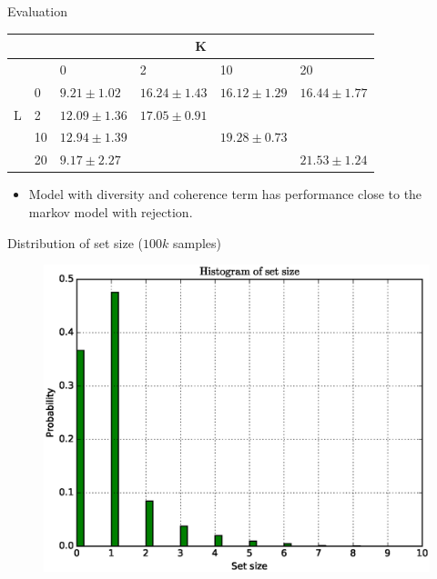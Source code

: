 \documentclass{beamer}
\begin{document}
\begin{frame}{Evaluation}
  \begin{table}
    \begin{tabular}{l|lllll}
      \hline
      & \multicolumn{5}{c}{K} \\
      \hline
      \multirow{5}{*}{L} & & 0 & 2 & 10 & 20 \\
      & 0 & $9.21 \pm 1.02$ & $16.24 \pm 1.43$ & $16.12 \pm 1.29$ & $16.44 \pm 1.77$\\
      & 2 & $12.09 \pm 1.36$ & $17.05 \pm 0.91$ &&\\
      & 10 & $12.94 \pm 1.39$ && $19.28 \pm 0.73$ &\\
      & 20 & $9.17 \pm 2.27$ &&& $\mathbf{21.53 \pm 1.24}$\\
    \end{tabular}
  \end{table}
  \begin{itemize}
    \item Model with diversity and coherence term has performance close to the markov model with rejection.
  \end{itemize}
\end{frame}

\begin{frame}{Distribution of set size ($100k$ samples)}
  \begin{figure}
    \centering
    \includegraphics[height=0.8\textheight]{length_histogram_gibbs_50}
  \end{figure}
\end{frame}
\end{document}
